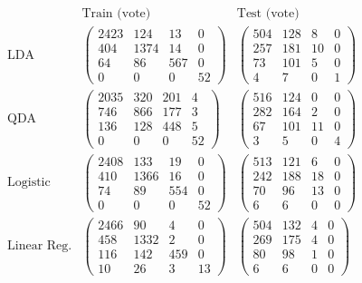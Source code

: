 \documentclass[11pt]{article}
\begin{document}
\[
\begin{array}{lcc}
 & \text{Train (vote)} & \text{Test (vote)} \\[4pt]
\text{LDA} &
\begin{pmatrix} 2423&124&13&0\\404&1374&14&0\\64&86&567&0\\0&0&0&52 \end{pmatrix} &
\begin{pmatrix} 504&128&8&0\\257&181&10&0\\73&101&5&0\\4&7&0&1 \end{pmatrix} \\[24pt]
\text{QDA} &
\begin{pmatrix} 2035&320&201&4\\746&866&177&3\\136&128&448&5\\0&0&0&52 \end{pmatrix} &
\begin{pmatrix} 516&124&0&0\\282&164&2&0\\67&101&11&0\\3&5&0&4 \end{pmatrix} \\[24pt]
\text{Logistic} &
\begin{pmatrix} 2408&133&19&0\\410&1366&16&0\\74&89&554&0\\0&0&0&52 \end{pmatrix} &
\begin{pmatrix} 513&121&6&0\\242&188&18&0\\70&96&13&0\\6&6&0&0 \end{pmatrix} \\[24pt]
\text{Linear Reg.} &
\begin{pmatrix} 2466&90&4&0\\458&1332&2&0\\116&142&459&0\\10&26&3&13 \end{pmatrix} &
\begin{pmatrix} 504&132&4&0\\269&175&4&0\\80&98&1&0\\6&6&0&0 \end{pmatrix}
\end{array}
\]
\end{document}
